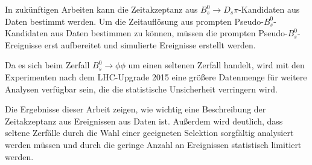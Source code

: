 \documentclass{article}
\begin{document}
  
\vspace{4mm}
In zukünftigen Arbeiten kann die Zeitakzeptanz aus $B_s^0\rightarrow D_s \pi$-Kandidaten aus Daten bestimmt werden. Um die Zeitauflösung aus prompten Pseudo-$B_s^0$-Kandidaten aus Daten bestimmen zu können, müssen die prompten Pseudo-$B_s^0$-Ereignisse erst aufbereitet und simulierte Ereignisse erstellt werden. 

Da es sich beim Zerfall $B_s^0\rightarrow \phi \phi$ um einen seltenen Zerfall handelt, wird mit den Experimenten nach dem LHC-Upgrade 2015 eine größere Datenmenge für weitere Analysen verfügbar sein, die die statistische Unsicherheit verringern wird. 

Die Ergebnisse dieser Arbeit zeigen, wie wichtig eine Beschreibung der Zeitakzeptanz aus Ereignissen aus Daten ist. Außerdem wird deutlich, dass seltene Zerfälle durch die Wahl einer geeigneten Selektion sorgfältig analysiert werden müssen und durch die geringe Anzahl an Ereignissen statistisch limitiert werden. %

\end{document}

